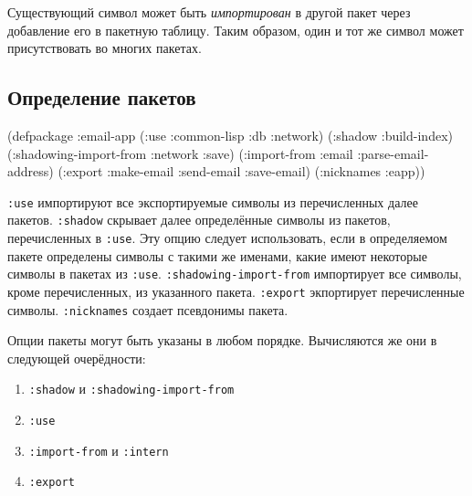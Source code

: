 Существующий символ может быть \emph{импортирован} в другой пакет через добавление его в пакетную таблицу. Таким образом, один и тот же символ может присутствовать во многих пакетах.

\subsection{Определение пакетов}
\begin{cllst}{}{}
(defpackage :email-app
  (:use :common-lisp :db :network)
  (:shadow :build-index)
  (:shadowing-import-from :network :save)
  (:import-from :email :parse-email-address)
  (:export :make-email
           :send-email
           :save-email)
  (:nicknames :eapp))
\end{cllst}

\lstinline{:use} импортируют все экспортируемые символы из перечисленных далее пакетов. \lstinline{:shadow} скрывает далее определённые символы из пакетов, перечисленных в \lstinline{:use}. Эту опцию следует использовать, если в определяемом пакете определены символы с такими же именами, какие имеют некоторые символы в пакетах из \lstinline{:use}. \lstinline{:shadowing-import-from} импортирует все символы, кроме перечисленных, из указанного пакета. \lstinline{:export} экпортирует перечисленные символы. \lstinline{:nicknames} создает псевдонимы пакета.

Опции пакеты могут быть указаны в любом порядке. Вычисляются же они в следующей очерёдности:
\begin{enumerate}
  \item \lstinline{:shadow} и \lstinline{:shadowing-import-from}
  \item \lstinline{:use}
  \item \lstinline{:import-from} и \lstinline{:intern}
  \item \lstinline{:export}
\end{enumerate}
